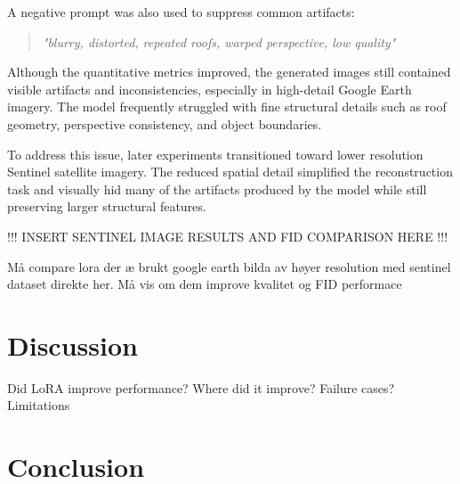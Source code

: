 \documentclass{article}
\begin{document}
A negative prompt was also used to suppress common artifacts:

\begin{quote}
    \textit{"blurry, distorted, repeated roofs, warped perspective, low quality"}
\end{quote}

Although the quantitative metrics improved, the generated images still contained visible artifacts and inconsistencies, especially in high-detail Google Earth imagery. The model frequently struggled with fine structural details such as roof geometry, perspective consistency, and object boundaries.

To address this issue, later experiments transitioned toward lower resolution Sentinel satellite imagery. The reduced spatial detail simplified the reconstruction task and visually hid many of the artifacts produced by the model while still preserving larger structural features.

\newpage

!!! INSERT SENTINEL IMAGE RESULTS AND FID COMPARISON HERE !!!

Må compare lora der æ brukt google earth bilda av høyer resolution med sentinel dataset direkte her. Må vis om dem improve kvalitet og FID performace

\section{Discussion}

Did LoRA improve performance?
Where did it improve?
Failure cases?
Limitations

\section{Conclusion}

\newpage
\printbibliography
\end{document}
